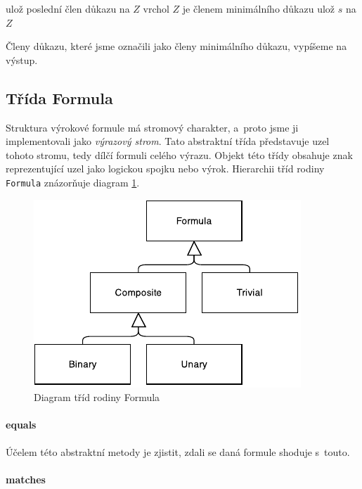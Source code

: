 \documentclass[thesis=B,czech,hidelinks]{thesis}[2012/06/26]
\begin{document}
\begin{algorithm}
ulož poslední člen důkazu na $Z$\;
{
	vrchol $Z$ je členem minimálního důkazu\;
	{
		ulož $s$ na $Z$\;
	}
}
\end{algorithm}

Členy důkazu, které jsme označili jako členy minimálního důkazu, vypíšeme na výstup.

\subsection{Třída Formula}

Struktura výrokové formule má stromový charakter, a~proto jsme ji implementovali jako \emph{výrazový strom}. Tato abstraktní třída představuje uzel tohoto stromu, tedy dílčí formuli celého výrazu. Objekt této třídy obsahuje znak reprezentující uzel jako logickou spojku nebo výrok. Hierarchii tříd rodiny \texttt{Formula} znázorňuje diagram \ref{fig:formula}.

\begin{figure}
\centering
\caption{Diagram tříd rodiny Formula}
\label{fig:formula}
\includegraphics{diagrams/formula}
\end{figure}

\paragraph{equals}

Účelem této abstraktní metody je zjistit, zdali se daná formule shoduje s~touto.

\paragraph{matches}
\end{document}

